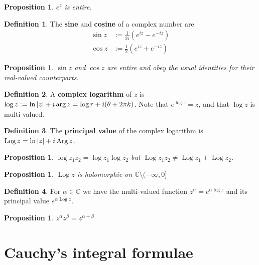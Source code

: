 \documentclass[12pt]{article}
\newtheorem{prop}[thm]{Proposition}
\theoremstyle{definition}
\newtheorem{defn}{Definition}[section]
\newcommand{\C}{\mathbb{C}}
\DeclarePairedDelimiter\abs{\lvert}{\rvert}
\DeclareMathOperator{\Arg}{Arg}
\DeclareMathOperator{\Log}{Log}
\begin{document}
\begin{prop}
  $e^z$ is entire.
\end{prop}

\begin{defn}
  The \textbf{sine} and \textbf{cosine} of a complex number are
  \begin{align*}
    \sin{z} &:= \frac{1}{2i}\left(e^{iz} - e^{-iz}\right)\\
    \cos{z} &:= \frac{1}{2}\left(e^{iz} + e^{-iz}\right)
  \end{align*}
\end{defn}

\begin{prop}
  $\sin{z}$ and $\cos{z}$ are entire and obey the usual identities for their real-valued counterparts.
\end{prop}

\begin{defn}
  A \textbf{complex logarithm} of $z$ is $\log{z} := \ln{\abs{z}} + i\arg{z} = \log{r} + i(\theta + 2\pi k)$.
  Note that $e^{\log{z}} = z$, and that $\log{z}$ is multi-valued.
\end{defn}

\begin{defn}
  The \textbf{principal value} of the complex logarithm is $\Log{z} = \ln{\abs{z}} + i\Arg{z}$.
\end{defn}

\begin{prop}
  $\log{z_1z_2} = \log{z_1}\log{z_2}$ but $\Log{z_1z_2} \neq \Log{z_1} + \Log{z_2}$.
\end{prop}

\begin{prop}
  $\Log{z}$ is holomorphic on $\C \setminus (-\infty, 0]$
\end{prop}

\begin{defn}
  For $\alpha \in \C$ we have the multi-valued function $z^{\alpha} = e^{\alpha\log{z}}$ and its principal value $e^{\alpha\Log{z}}$.
\end{defn}

\begin{prop}
  $z^{\alpha}z^{\beta} = z^{\alpha + \beta}$
\end{prop}

\section{Cauchy's integral formulae}
\end{document}
